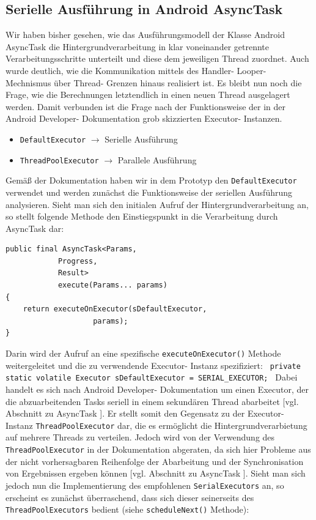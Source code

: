 \documentclass[12pt,oneside,a4paper,bibtotoc,liststotoc]{scrreprt}
\begin{document}
\subsection{Serielle Ausführung in Android AsyncTask}
Wir haben bisher gesehen, wie das Ausführungsmodell der Klasse Android AsyncTask die Hintergrundverarbeitung in klar voneinander getrennte Verarbeitungsschritte unterteilt und diese dem jeweiligen Thread zuordnet. Auch wurde deutlich, wie die Kommunikation mittels des Handler- Looper- Mechnismus über Thread- Grenzen hinaus realisiert ist. Es bleibt nun noch die Frage, wie die Berechnungen letztendlich in einen neuen Thread ausgelagert werden. Damit verbunden ist die Frage nach der Funktionsweise der in der Android Developer- Dokumentation grob skizzierten Executor- Instanzen.
\begin{itemize}
\item \texttt{DefaultExecutor} $\rightarrow$ Serielle Ausführung
\item \texttt{ThreadPoolExecutor} $\rightarrow$ Parallele Ausführung
\end{itemize}
Gemäß der Dokumentation haben wir in dem Prototyp den \texttt{DefaultExecutor} verwendet und werden zunächst die Funktionsweise der seriellen Ausführung analysieren. Sieht man sich den initialen Aufruf der Hintergrundverarbeitung an, so stellt folgende Methode den Einstiegspunkt in die Verarbeitung durch AsyncTask dar:\newpage
\begin{lstlisting}
public final AsyncTask<Params, 
			Progress, 
			Result> 
			execute(Params... params)
{
    return executeOnExecutor(sDefaultExecutor, 
    				params);
}
\end{lstlisting}
Darin wird der Aufruf an eine spezifische \texttt{executeOnExecutor()} Methode weitergeleitet und die zu verwendende Executor- Instanz spezifiziert:\newline
\texttt{\newline
private static volatile Executor sDefaultExecutor \newline
                            = SERIAL\_EXECUTOR;\newline
}\newline
Dabei handelt es sich nach Android Developer- Dokumentation um einen Executor, der die abzuarbeitenden Tasks seriell in einem sekundären Thread abarbeitet  [vgl. Abschnitt zu AsyncTask \citet{androidDevDocu}]. Er stellt somit den Gegensatz zu der Executor- Instanz \texttt{ThreadPoolExecutor} dar, die es ermöglicht die Hintergrundverarbietung auf mehrere Threads zu verteilen. Jedoch wird von der Verwendung des \texttt{ThreadPoolExecutor} in der Dokumentation abgeraten, da sich hier Probleme aus der nicht vorhersagbaren Reihenfolge der Abarbeitung und der Synchronisation von Ergebnissen ergeben können [vgl. Abschnitt zu AsyncTask \citet{androidDevDocu}]. Sieht man sich jedoch nun die Implementierung des empfohlenen \texttt{SerialExecutors} an, so erscheint es zunächst überraschend, dass sich dieser seinerseits des \texttt{ThreadPoolExecutors} bedient (siehe \texttt{scheduleNext()} Methode):\newpage
\end{document}
